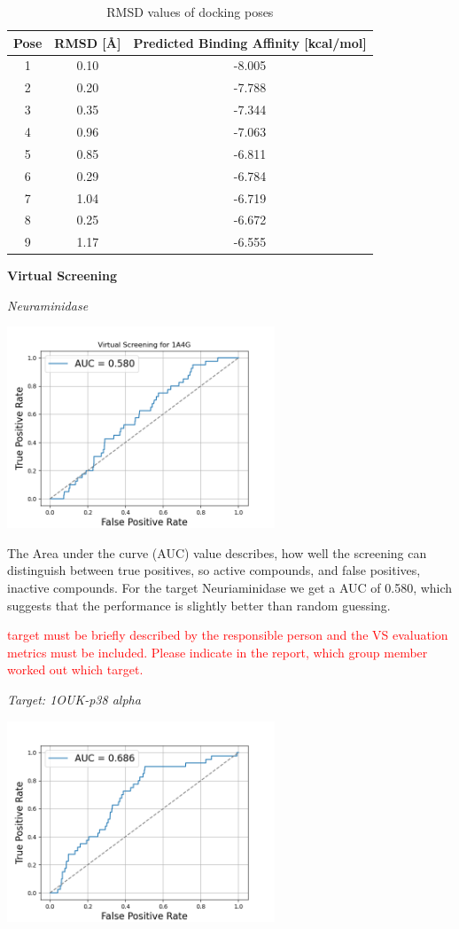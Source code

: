 \documentclass[a4paper,10pt]{article}
\begin{document}
\begin{table}[h!]
\centering
\caption{RMSD values of docking poses}
\label{tab:rmsd}
\begin{tabular}{|c|c|c|}
\hline
\textbf{Pose} & \textbf{RMSD [\AA]} & \textbf{Predicted Binding Affinity [kcal/mol]} \\
\hline
1 & 0.10 & -8.005\\
2 & 0.20 & -7.788\\
3 & 0.35 & -7.344\\
4 & 0.96 & -7.063\\
5 & 0.85 & -6.811\\
6 & 0.29 & -6.784 \\
7 & 1.04 & -6.719 \\
8 & 0.25 & -6.672\\
9 & 1.17 & -6.555 \\
\hline
\end{tabular}
\end{table}


\textbf{Virtual Screening}

\textit{Neuraminidase} 
\begin{center}
\includegraphics[width=8cm]{figures/ROC.png}
\end{center}

The Area under the curve (AUC) value describes, how well the screening can distinguish between true positives, so active compounds, and false positives, inactive compounds. For the target Neuriaminidase we get a AUC of 0.580, which suggests that the performance is slightly better than random guessing. 

\textcolor{red}{target must be
briefly described by the responsible person and the VS evaluation metrics must be included. Please indicate in
the report, which group member worked out which target.}

\textit{Target: 1OUK-p38 alpha}

\begin{center}
\includegraphics[width=8cm]{figures/ROC-1OUK.png}
\end{center}
\end{document}
